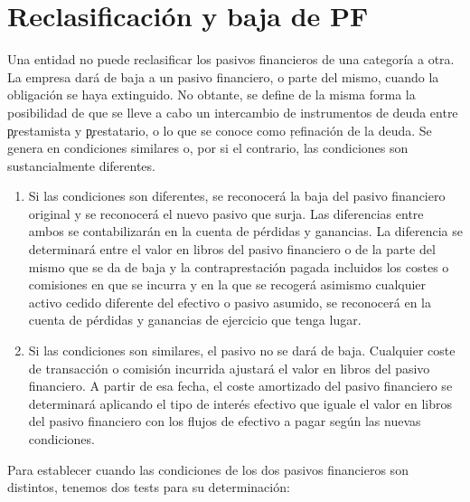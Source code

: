 

\newpage 
\section{Reclasificación y baja de PF}

Una entidad no puede reclasificar los pasivos financieros de una categoría a otra. La empresa dará de baja a un pasivo financiero, o parte del mismo, cuando la obligación se haya extinguido. No obtante, se define de la misma forma la posibilidad de que se lleve a cabo un intercambio de instrumentos de deuda entre \c{prestamista} y \c{prestatario}, o lo que se conoce como \c{refinación de la deuda}. Se genera en condiciones similares o, por si el contrario, las condiciones son sustancialmente diferentes.

\begin{enumerate}[label=$\rightarrow$]
    \item Si las condiciones son diferentes, se reconocerá la baja del pasivo financiero original y se reconocerá el nuevo pasivo que surja. Las diferencias entre ambos se contabilizarán en la cuenta de pérdidas y ganancias. La diferencia se determinará entre el valor en libros del pasivo financiero o de la parte del mismo que se da de baja y la contraprestación pagada incluidos los costes o comisiones en que se incurra y en la que se recogerá asimismo cualquier activo cedido diferente del efectivo o pasivo asumido, se reconocerá en la cuenta de pérdidas y ganancias de ejercicio que tenga lugar.
    \item Si las condiciones son similares, el pasivo no se dará de baja. Cualquier coste de transacción o comisión  incurrida ajustará el valor en libros del pasivo financiero. A partir de esa fecha, el coste amortizado del pasivo financiero se determinará aplicando el tipo de interés efectivo que iguale el valor en libros del pasivo financiero con los flujos de efectivo a pagar según las nuevas condiciones. 
\end{enumerate}

Para establecer cuando las condiciones de los dos pasivos financieros son distintos, tenemos dos tests para su determinación:

